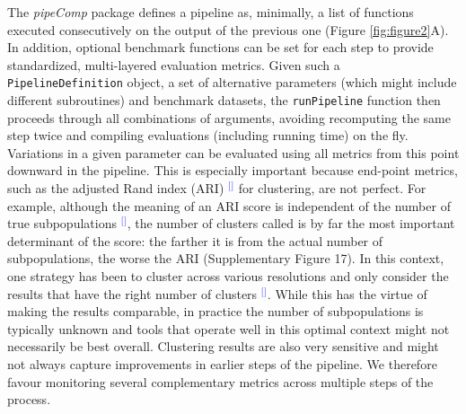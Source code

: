 \documentclass[11pt]{article}
\renewcommand{\cite}[1]{\textcolor{Blue}{$^[$\supercite{#1}$^]$}}
\begin{document}
The \textit{pipeComp} package defines a pipeline as, minimally, a list of functions executed consecutively on the output of the previous one (Figure \ref{fig:figure2}A). In addition, optional benchmark functions can be set for each step to provide standardized, multi-layered evaluation metrics. Given such a \texttt{PipelineDefinition} object, a set of alternative parameters (which might include different subroutines) and benchmark datasets, the \texttt{runPipeline} function then proceeds through all combinations of arguments, avoiding recomputing the same step twice and compiling evaluations (including running time) on the fly. Variations in a given parameter can be evaluated using all metrics from this point downward in the pipeline. This is especially important because end-point metrics, such as the adjusted Rand index (ARI) \cite{HubertARI1985} for clustering, are not perfect. For example, although the meaning of an ARI score is independent of the number of true subpopulations \cite{steinleyProperties2004}, the number of clusters called is by far the most important determinant of the score: the farther it is from the actual number of subpopulations, the worse the ARI (Supplementary Figure 17). In this context, one strategy has been to cluster across various resolutions and only consider the results that have the right number of clusters \cite{duoClustering2018}. While this has the virtue of making the results comparable, in practice the number of subpopulations is typically unknown and tools that operate well in this optimal context might not necessarily be best overall. Clustering results are also very sensitive and might not always capture improvements in earlier steps of the pipeline. We therefore favour monitoring several complementary metrics across multiple steps of the process.
\end{document}
